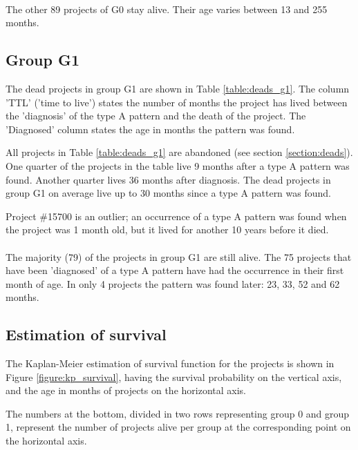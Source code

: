 \paragraph{}
The other 89 projects of G0 stay alive. Their age varies between 13 and 255
months.

\subsection{Group G1}
\label{section:group_g1}
The dead projects in group G1 are shown in Table \ref{table:deads_g1}. The
column 'TTL' ('time to live') states the number of months the project has
lived between the 'diagnosis' of the type A pattern and the death of the
project. The 'Diagnosed' column states the age in months the pattern was found.



\noindent
All projects in Table \ref{table:deads_g1} are abandoned (see section
\ref{section:deads}). One quarter of the projects in the table live 9 months
after a type A pattern was found. Another quarter lives 36 months after
diagnosis. The dead projects in group G1 on average live up to 30 months since
a type A pattern was found.

Project \#15700 is an outlier; an occurrence of a type A pattern was found when
the project was 1 month old, but it lived for another 10 years before it died.

\paragraph{}
The majority (79) of the projects in group G1 are still alive. The 75 projects
that have been 'diagnosed' of a type A pattern have had the occurrence in their
first month of age. In only 4 projects the pattern was found later: 23, 33, 52
and 62 months.

\subsection{Estimation of survival}
\label{section:kp_survival_results}
The Kaplan-Meier estimation of survival function for the projects is shown in
Figure \ref{figure:kp_survival}, having the survival probability on the
vertical axis, and the age in months of projects on the horizontal axis.

The numbers at the bottom, divided in two rows representing group 0 and group
1, represent the number of projects alive per group at the corresponding point
on the horizontal axis.

